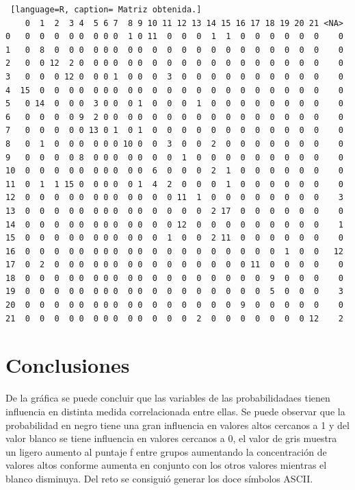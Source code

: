 \documentclass{article}
\begin{document}
\begin{lstlisting} [language=R, caption= Matriz obtenida.]
    0  1  2  3 4  5 6 7  8 9 10 11 12 13 14 15 16 17 18 19 20 21 <NA>
0   0  0  0  0 0  0 0 0  1 0 11  0  0  0  1  1  0  0  0  0  0  0    0
1   0  8  0  0 0  0 0 0  0 0  0  0  0  0  0  0  0  0  0  0  0  0    0
2   0  0 12  2 0  0 0 0  0 0  0  0  0  0  0  0  0  0  0  0  0  0    0
3   0  0  0 12 0  0 0 1  0 0  0  3  0  0  0  0  0  0  0  0  0  0    0
4  15  0  0  0 0  0 0 0  0 0  0  0  0  0  0  0  0  0  0  0  0  0    0
5   0 14  0  0 0  3 0 0  0 1  0  0  0  1  0  0  0  0  0  0  0  0    0
6   0  0  0  0 9  2 0 0  0 0  0  0  0  0  0  0  0  0  0  0  0  0    0
7   0  0  0  0 0 13 0 1  0 1  0  0  0  0  0  0  0  0  0  0  0  0    0
8   0  1  0  0 0  0 0 0 10 0  0  3  0  0  2  0  0  0  0  0  0  0    0
9   0  0  0  0 8  0 0 0  0 0  0  0  1  0  0  0  0  0  0  0  0  0    0
10  0  0  0  0 0  0 0 0  0 0  6  0  0  0  2  1  0  0  0  0  0  0    0
11  0  1  1 15 0  0 0 0  0 1  4  2  0  0  0  1  0  0  0  0  0  0    0
12  0  0  0  0 0  0 0 0  0 0  0  0 11  1  0  0  0  0  0  0  0  0    3
13  0  0  0  0 0  0 0 0  0 0  0  0  0  0  2 17  0  0  0  0  0  0    0
14  0  0  0  0 0  0 0 0  0 0  0  0 12  0  0  0  0  0  0  0  0  0    1
15  0  0  0  0 0  0 0 0  0 0  0  1  0  0  2 11  0  0  0  0  0  0    0
16  0  0  0  0 0  0 0 0  0 0  0  0  0  0  0  0  0  0  0  1  0  0   12
17  0  2  0  0 0  0 0 0  0 0  0  0  0  0  0  0  0 11  0  0  0  0    0
18  0  0  0  0 0  0 0 0  0 0  0  0  0  0  0  0  0  0  9  0  0  0    0
19  0  0  0  0 0  0 0 0  0 0  0  0  0  0  0  0  0  0  5  0  0  0    3
20  0  0  0  0 0  0 0 0  0 0  0  0  0  0  0  0  9  0  0  0  0  0    0
21  0  0  0  0 0  0 0 0  0 0  0  0  0  2  0  0  0  0  0  0  0 12    2
\end{lstlisting}



\section{Conclusiones}
De la gráfica se puede concluir que las variables de las probabilidadaes tienen influencia en distinta medida correlacionada entre ellas. Se puede observar que la probabilidad en negro tiene una gran influencia en valores altos cercanos a 1 y del valor blanco se tiene influencia en valores cercanos a 0, el valor de gris muestra un ligero aumento al puntaje f entre grupos aumentando la concentración de valores altos conforme aumenta en conjunto con los otros valores mientras el blanco disminuya. Del reto se consiguió generar los doce símbolos ASCII.



\end{document}
